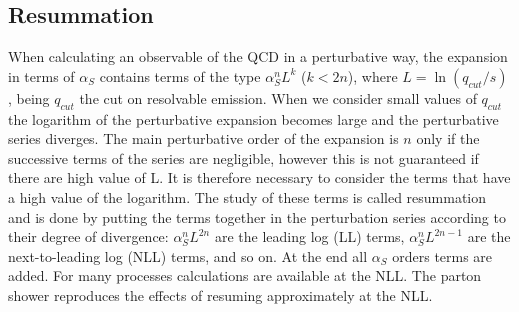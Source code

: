 \subsection*{Resummation} When calculating an observable of the QCD in a perturbative way, the expansion in terms of $ \alpha_S $ contains terms of the type $ \alpha_S^n L^k $ ($ k < 2n $), where $ L = \ln (q_{cut} / s) $, being $ q_{cut} $ the cut on resolvable emission. 
When we consider small values of  $q_{cut}$ the logarithm of the perturbative expansion becomes large and the  perturbative series diverges.
The main  perturbative order of the expansion is $n$  only if the successive terms of the series are negligible, however this is not guaranteed if there are high value of L. 
It is therefore necessary to consider the terms that have a high value of the logarithm. The study of these terms is called resummation and is done by putting the terms together in the perturbation series according to their degree of divergence:
$ \alpha_S ^ n L ^ {2n} $ are the leading log (LL) terms, $ \alpha_S ^ n L ^ {2n-1} $ are the next-to-leading log (NLL) terms, and so on. 
At the end  all $ \alpha_S $ orders terms are added. For many processes calculations are available at the NLL.
The parton shower reproduces the effects of resuming approximately at the NLL.

